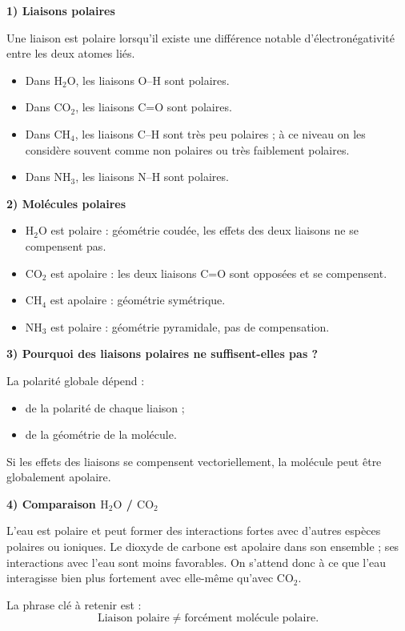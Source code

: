 \documentclass[11pt,a4paper]{article}
\begin{document}
\begin{corrigebox}
\textbf{1) Liaisons polaires}

Une liaison est polaire lorsqu'il existe une différence notable d'électronégativité entre les deux atomes liés.
\begin{itemize}
    \item Dans \(\mathrm{H_2O}\), les liaisons O--H sont polaires.
    \item Dans \(\mathrm{CO_2}\), les liaisons C=O sont polaires.
    \item Dans \(\mathrm{CH_4}\), les liaisons C--H sont très peu polaires ; à ce niveau on les considère souvent comme non polaires ou très faiblement polaires.
    \item Dans \(\mathrm{NH_3}\), les liaisons N--H sont polaires.
\end{itemize}

\textbf{2) Molécules polaires}

\begin{itemize}
    \item \(\mathrm{H_2O}\) est polaire : géométrie coudée, les effets des deux liaisons ne se compensent pas.
    \item \(\mathrm{CO_2}\) est apolaire : les deux liaisons C=O sont opposées et se compensent.
    \item \(\mathrm{CH_4}\) est apolaire : géométrie symétrique.
    \item \(\mathrm{NH_3}\) est polaire : géométrie pyramidale, pas de compensation.
\end{itemize}

\textbf{3) Pourquoi des liaisons polaires ne suffisent-elles pas ?}

La polarité globale dépend :
\begin{itemize}
    \item de la polarité de chaque liaison ;
    \item de la géométrie de la molécule.
\end{itemize}
Si les effets des liaisons se compensent vectoriellement, la molécule peut être globalement apolaire.

\textbf{4) Comparaison \(\mathrm{H_2O}\) / \(\mathrm{CO_2}\)}

L'eau est polaire et peut former des interactions fortes avec d'autres espèces polaires ou ioniques.  
Le dioxyde de carbone est apolaire dans son ensemble ; ses interactions avec l'eau sont moins favorables.  
On s'attend donc à ce que l'eau interagisse bien plus fortement avec elle-même qu'avec \(\mathrm{CO_2}\).

\begin{bilanbox}
La phrase clé à retenir est :
\[
\text{Liaison polaire} \neq \text{forcément molécule polaire}.
\]
\end{bilanbox}
\end{corrigebox}
\end{document}
